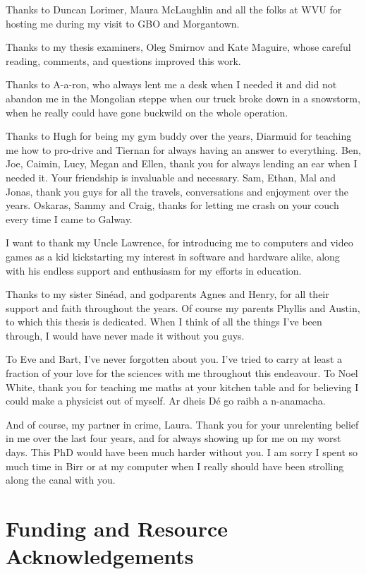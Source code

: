 Thanks to Duncan Lorimer, Maura McLaughlin and all the folks at WVU for hosting me during my visit to GBO and Morgantown. 

Thanks to my thesis examiners, Oleg Smirnov and Kate Maguire, whose careful reading, comments, and questions improved this work. 

Thanks to A-a-ron, who always lent me a desk when I needed it and did not abandon me in the Mongolian steppe when our truck broke down in a snowstorm, when he really could have gone buckwild on the whole operation. 

Thanks to Hugh for being my gym buddy over the years, Diarmuid for teaching me how to pro-drive and Tiernan for always having an answer to everything. Ben, Joe, Caimin, Lucy, Megan and Ellen, thank you for always lending an ear when I needed it. Your friendship is invaluable and necessary. 
Sam, Ethan, Mal and Jonas, thank you guys for all the travels, conversations and enjoyment over the years. 
Oskaras, Sammy and Craig, thanks for letting me crash on your couch every time I came to Galway.

I want to thank my Uncle Lawrence, for introducing me to computers and video games as a kid kickstarting my interest in software and hardware alike, along with his endless support and enthusiasm for my efforts in education. 

Thanks to my sister Sinéad, and godparents Agnes and Henry, for all their support and faith throughout the years. Of course my parents Phyllis and Austin, to which this thesis is dedicated. When I think of all the things I've been through, I would have never made it without you guys. 

To Eve and Bart, I've never forgotten about you. I've tried to carry at least a fraction of your love for the sciences with me throughout this endeavour. To Noel White, thank you for teaching me maths at your kitchen table and for believing I could make a physicist out of myself. Ar dheis Dé go raibh a n-anamacha.

And of course, my partner in crime, Laura. Thank you for your unrelenting belief in me over the last four years, and for always showing up for me on my worst days. This PhD would have been much harder without you. I am sorry I spent so much time in Birr or at my computer when I really should have been strolling along the canal with you.

\newpage 
\thispagestyle{empty}
\section*{Funding and Resource Acknowledgements}

